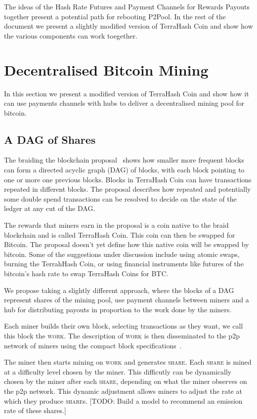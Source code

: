 \documentclass{article}
\begin{document}
The ideas of the Hash Rate Futures and Payment Channels for Rewards
Payouts together present a potential path for rebooting P2Pool. In the
rest of the document we present a slightly modified version of
TerraHash Coin and show how the various components can work toegether.

\section{Decentralised Bitcoin Mining}

In this section we present a modified version of TerraHash Coin and
show how it can use payments channels with hubs to deliver a
decentralised mining pool for bitcoin.

\subsection{A DAG of Shares}

The braiding the blockchain proposal~\cite{mcelrath:variance} shows
how smaller more frequent blocks can form a directed acyclic graph
(DAG) of blocks, with each block pointing to one or more one previous
blocks. Blocks in TerraHash Coin can have transactions repeated in
different blocks. The proposal describes how repeated and potentially
some double spend transactions can be resolved to decide on the state
of the ledger at any cut of the DAG.\@

The rewards that miners earn in the proposal is a coin native to the
braid blockchain and is called TerraHash Coin. This coin can then be
swapped for Bitcoin. The proposal doesn't yet define how this native
coin will be swapped by bitcoin. Some of the suggestions under
discussion include using atomic swaps, burning the TerrahHash Coin, or
using financial instruments like futures of the bitcoin's hash
rate to swap TerraHash Coins for BTC.\@

We propose taking a slightly different approach, where the blocks of a
DAG represent shares of the mining pool, use payment channels between
miners and a hub for distributing payouts in proportion to the work done
by the miners.

Each miner builds their own block, selecting transactions as they
want, we call this block the \textsc{work}. The description of
\textsc{work} is then disseminated to the p2p network of miners using
the compact block specifications~\cite{compact-blocks}.

The miner then starts mining on \textsc{work} and generates
\textsc{share}. Each \textsc{share} is mined at a difficulty level
chosen by the miner. This difficutly can be dynamically chosen by the
miner after each \textsc{share}, depending on what the miner observes
on the p2p network. This dynamic adjustment allows miners to adjust
the rate at which they produce \textsc{share}s. [TODO: Build a model to
recommend an emission rate of these shares.]
\end{document}
